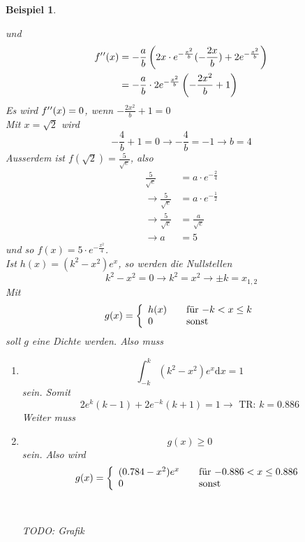 \documentclass{report}
\newtheorem{myexample}{Beispiel}
\begin{document}
\begin{myexample}
\begin{enumerate}
und
\begin{align*}
f\rq{}\rq{}(x) &= -\frac{a}{b} \left( 2x \cdot e^{-\frac{x^2}{b}} (-\frac{2x}{b}) + 2e^{-\frac{x^2}{b}}\right)\\
&= -\frac{a}{b} \cdot 2e^{-\frac{x^2}{b}} \left(-\frac{2x^2}{b} + 1\right)
\end{align*}
Es wird $f\rq{}\rq{}(x) = 0$, wenn $- \frac{2x^2}{b} + 1 = 0$\\
Mit $x = \sqrt{2}$ wird
\begin{equation}
-\frac{4}{b} + 1 = 0 \longrightarrow -\frac{4}{b} = -1 \longrightarrow b = 4
\end{equation}
Ausserdem ist $f(\sqrt{2}) = \frac{5}{\sqrt{e}}$, also
\begin{align*}
\frac{5}{\sqrt{e}} &= a \cdot e^{-\frac{2}{4}}\\
\longrightarrow \frac{5}{\sqrt{e}} &= a \cdot e^{-\frac{1}{2}}\\
\longrightarrow \frac{5}{\sqrt{e}} &= \frac{a}{\sqrt{e}}\\
\longrightarrow a &= 5
\end{align*}
und so $f(x) = 5 \cdot e^{-\frac{x^2}{4}}$.\\
Ist $h(x) = (k^2 - x^2) e^x$, so werden die Nullstellen
\begin{equation}
k^2 - x^2 = 0 \longrightarrow k^2 = x^2 \longrightarrow \pm k = x_{1,2}
\end{equation}
Mit
\[ g(x) = \left\{ 
  \begin{array}{l l}
    h(x) & \quad \text{für $-k < x \leq k$}\\
    0 & \quad \text{sonst}
  \end{array} \right.\]
soll $g$ eine Dichte werden. Also muss
\begin{enumerate}
\item
\begin{equation}
\int_{-k}^{k} \left( k^2 - x^2 \right) e^x \mathrm{d}x = 1
\end{equation}
sein. Somit
\begin{equation}
2e^k (k-1) + 2e^{-k} (k+1) = 1 \longrightarrow \mbox{ TR: } k=0.886
\end{equation}
Weiter muss
\item
\begin{equation}
g(x) \geq 0
\end{equation}
sein. Also wird
\[ g(x) = \left\{ 
  \begin{array}{l l}
    (0.784 - x^2) e^x & \quad \text{für $-0.886 < x \leq 0.886$}\\
    0 & \quad \text{sonst}
  \end{array} \right.\]
\\\\TODO: Grafik\\\\
\end{enumerate}
\end{enumerate}
\end{myexample}
\end{document}
